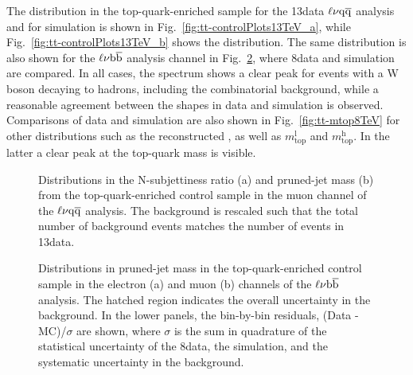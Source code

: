 The \mJ distribution in the top-quark-enriched sample for the 13\TeV data $\ell\nu\mathrm{q}\overline{\mathrm{q}}$ analysis and for simulation is shown in Fig.~\ref{fig:tt-controlPlots13TeV_a}, while Fig.~\ref{fig:tt-controlPlots13TeV_b} shows the \nsubj distribution.
The same distribution is also shown for the $\ell\nu{\mathrm{b}\overline{\mathrm{b}}}$ analysis channel in Fig.~\ref{fig:tt-controlPlots8TeV}, where 8\TeV data and simulation are compared.
In all cases, the \mJ spectrum shows a clear peak for events with a W boson decaying to hadrons, including the combinatorial background, while a reasonable agreement between the shapes in data and simulation is observed.
Comparisons of data and simulation are also shown in Fig.~\ref{fig:tt-mtop8TeV} for other distributions such as the reconstructed \mlvj, as well as $m_\mathrm{top}^\mathrm{l}$ and $m_\mathrm{top}^\mathrm{h}$.
In the latter a clear peak at the top-quark mass is visible.

\begin{figure}[!htb]
\centering
{}
\caption{Distributions in the N-subjettiness ratio \nsubj (a) and pruned-jet mass \mJ (b) from the top-quark-enriched control sample in the muon channel of the $\ell\nu\mathrm{q}\overline{\mathrm{q}}$ analysis. The \ttbar background is rescaled such that the total number of background events matches the number of events in 13\TeV data.}
\label{fig:tt-controlPlots13TeV}
\end{figure}

\begin{figure}[!htb]
\centering
{}
\caption{Distributions in pruned-jet mass \mJ in the top-quark-enriched control sample in the electron (a) and muon (b) channels of the $\ell\nu{\mathrm{b}\overline{\mathrm{b}}}$ analysis. The hatched region indicates the overall uncertainty in the background. In the lower panels, the bin-by-bin residuals, (Data - MC)/$\sigma$ are shown, where $\sigma$ is the sum in quadrature of the statistical uncertainty of the 8\TeV data, the simulation, and the systematic uncertainty in the \ttbar background.}
\label{fig:tt-controlPlots8TeV}
\end{figure}

